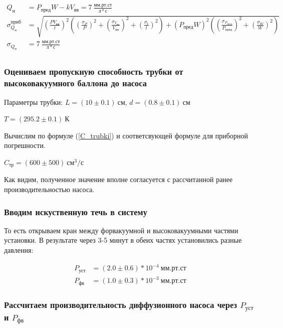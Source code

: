 \documentclass[a4paper, 12pt]{article}
\begin{document}
            \begin{align*}
                Q_н &= P_{пред} W - k V_{вв} = 7~\frac{мм.рт.ст}{л*с}\\
                \sigma_{Q_н}^{приб} &= \sqrt{ \left( \frac{P V_{вв}}{t} \right)^2 \left( \left( \frac{\sigma_P}{P} \right)^2 + \left( \frac{\sigma_{V_{вв}}}{V_{вв}} \right)^2 + \left( \frac{\sigma_t}{t} \right)^2 \right) + \left( P_{пред} W \right)^2 \left( \left( \frac{\sigma_{P_{пред}}}{P_{пред}} \right)^2 + \left( \frac{\sigma_W}{W} \right)^2 \right)}\\
                \sigma_{Q_н} &= 7~\frac{мм.рт.ст}{л*с}\\
            \end{align*}

        \subsubsection{Оцениваем пропускную способность трубки от высоковакуумного баллона до насоса}

            Параметры трубки: $L = (10 \pm 0.1)~см$, $d = (0.8 \pm 0.1)~см$

            $T = (295.2 \pm 0.1)~К$

            Вычислим по формуле (\ref{C_trubki}) и соответсвующей формуле для приборной погрешности.

            $C_{тр} = (600 \pm 500)~см^3/с$

            Как видим, полученное значение вполне согласуется с рассчитанной ранее производительностью насоса.

        \subsubsection{Вводим искуственную течь в систему}

            То есть открываем кран между форвакуумной и высоковакуумными частями установки. В результате через 3-5 минут в обеих частях установились разные давления:

            \begin{align*}
                P_{уст} &= (2.0 \pm 0.6)*10^{-4}~мм.рт.ст\\
                P_{фв} &= (1.0 \pm 0.3)*10^{-3}~мм.рт.ст
            \end{align*}

        \subsubsection{Рассчитаем производительность диффузионного насоса через $P_{уст}$ и $P_{фв}$}
\end{document}
